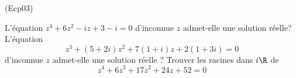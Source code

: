 \begin{tiny}(Ecp03)\end{tiny}
L'{\'e}quation $z^{4}+6z^{2}-iz+3-i=0$ d'inconnue $z$ admet-elle une solution r{\'e}elle?\newline
L'équation
\begin{displaymath}
 z^3+(5+2i)z^2+7(1+i)z+2(1+3i)=0
\end{displaymath}
d'inconnue $z$ admet-elle une solution réelle ?\newline
Trouver les racines dans $i\R$ de 
\begin{displaymath}
 z^4 + 6z^3 + 17z^2 + 24z + 52 =0
\end{displaymath}
